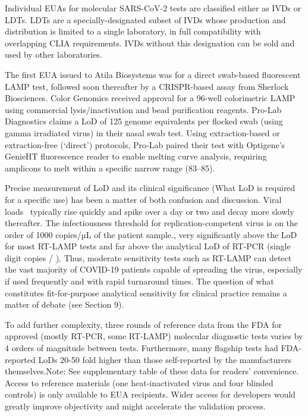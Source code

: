            Individual EUAs for molecular SARS-CoV-2 tests are classified either as IVDs or LDTs. LDTs are a specially-designated subset of IVDs whose production and distribution is limited to a single laboratory, in full compatibility with overlapping CLIA requirements. IVDs without this designation can be sold and used by other laboratories.

            The first EUA issued to Atila Biosystems was for a direct swab-based fluorescent LAMP test, followed soon thereafter by a CRISPR-based assay from Sherlock Biosciences. Color Genomics received approval for a 96-well colorimetric LAMP using commercial lysis/inactivation and bead purification reagents. Pro-Lab Diagnostics claims a LoD of 125 genome equivalents per flocked swab (using gamma irradiated virus) in their nasal swab test. Using extraction-based or extraction-free (‘direct’) protocols, Pro-Lab paired their test with Optigene's GenieHT fluorescence reader to enable melting curve analysis, requiring amplicons to melt within a specific narrow range (\qtyrange{83}{85}{\degC}).

            Precise measurement of LoD and its clinical significance (What LoD is required for a specific use) has been a matter of both confusion and discussion. Viral loads~\cite{Woefel2020a,Woefel2020b} typically rise quickly and spike over a day or two and decay more slowly thereafter.\cite{Larremore2020} The infectiousness threshold for replication-competent virus is on the order of 1000 copies/µL of the patient sample.\cite{Pan2020}, very significantly above the LoD for most RT-LAMP tests and far above the analytical LoD of RT-PCR (single digit copies / \ul). Thus, moderate sensitivity tests such as RT-LAMP can detect the vast majority of COVID-19 patients capable of spreading the virus, especially if used frequently and with rapid turnaround times. The question of what constitutes fit-for-purpose analytical sensitivity for clinical practice remains a matter of debate (see Section 9).

            To add further complexity, three rounds of reference data from the FDA for approved (mostly RT-PCR, some RT-LAMP) molecular diagnostic tests varies by 4 orders of magnitude between tests.\cite{MacKay2020} Furthermore, many flagship tests had FDA-reported LoDs 20-50 fold higher than those self-reported by the manufacturers themselves.\cite{FDAEUA2020}Note: See supplementary table of these data for readers’ convenience. Access to reference materials (one heat-inactivated virus and four blinded controls) is only available to EUA recipients. Wider access for developers would greatly improve objectivity and might accelerate the validation process.

